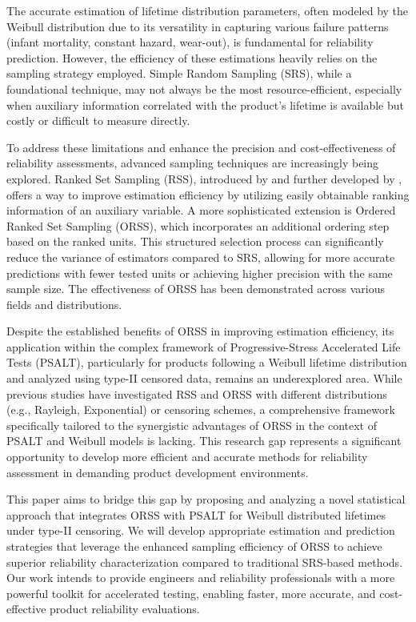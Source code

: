 \documentclass[twoside]{article}
\begin{document}
The accurate estimation of lifetime distribution parameters, often modeled by the Weibull distribution due to its versatility in capturing various failure patterns (infant mortality, constant hazard, wear-out), is fundamental for reliability prediction. However, the efficiency of these estimations heavily relies on the sampling strategy employed. Simple Random Sampling (SRS), while a foundational technique, may not always be the most resource-efficient, especially when auxiliary information correlated with the product’s lifetime is available but costly or difficult to measure directly.

To address these limitations and enhance the precision and cost-effectiveness of reliability assessments, advanced sampling techniques are increasingly being explored. Ranked Set Sampling (RSS), introduced by \cite{McIntyre1952} and further developed by \cite{Takahasi1968}, offers a way to improve estimation efficiency by utilizing easily obtainable ranking information of an auxiliary variable. A more sophisticated extension is Ordered Ranked Set Sampling (ORSS), which incorporates an additional ordering step based on the ranked units. This structured selection process can significantly reduce the variance of estimators compared to SRS, allowing for more accurate predictions with fewer tested units or achieving higher precision with the same sample size. The effectiveness of ORSS has been demonstrated across various fields and distributions.

Despite the established benefits of ORSS in improving estimation efficiency, its application within the complex framework of Progressive-Stress Accelerated Life Tests (PSALT), particularly for products following a Weibull lifetime distribution and analyzed using type-II censored data, remains an underexplored area. While previous studies have investigated RSS and ORSS with different distributions (e.g., Rayleigh, Exponential) or censoring schemes, a comprehensive framework specifically tailored to the synergistic advantages of ORSS in the context of PSALT and Weibull models is lacking. This research gap represents a significant opportunity to develop more efficient and accurate methods for reliability assessment in demanding product development environments.

This paper aims to bridge this gap by proposing and analyzing a novel statistical approach that integrates ORSS with PSALT for Weibull distributed lifetimes under type-II censoring. We will develop appropriate estimation and prediction strategies that leverage the enhanced sampling efficiency of ORSS to achieve superior reliability characterization compared to traditional SRS-based methods. Our work intends to provide engineers and reliability professionals with a more powerful toolkit for accelerated testing, enabling faster, more accurate, and cost-effective product reliability evaluations.
\end{document}
